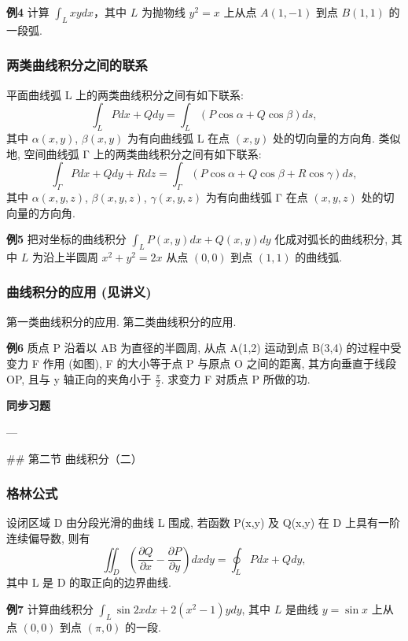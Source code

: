 \textbf{例4} 计算 \(\int_{L} xydx\)，其中 \(L\) 为抛物线 \(y^2 = x\) 上从点 \(A(1, -1)\) 到点 \(B(1, 1)\) 的一段弧.


\subsubsection*{两类曲线积分之间的联系}


平面曲线弧 L 上的两类曲线积分之间有如下联系:
\[ \int_L Pdx + Qdy = \int_L (P \cos \alpha + Q \cos \beta) ds, \]
其中 \(\alpha(x, y)\), \(\beta(x, y)\) 为有向曲线弧 L 在点 \((x, y)\) 处的切向量的方向角.
类似地, 空间曲线弧 Γ 上的两类曲线积分之间有如下联系:
\[ \int_{\Gamma} Pdx + Qdy + Rdz = \int_{\Gamma} (P \cos \alpha + Q \cos \beta + R \cos \gamma) ds, \]
其中 \(\alpha(x, y, z)\), \(\beta(x, y, z)\), \(\gamma(x, y, z)\) 为有向曲线弧 Γ 在点 \((x, y, z)\) 处的切向量的方向角.

\textbf{例5} 把对坐标的曲线积分 \(\int_{L} P(x, y) dx + Q(x, y) dy\) 化成对弧长的曲线积分, 其中 \(L\) 为沿上半圆周 \(x^2 + y^2 = 2x\) 从点 \((0, 0)\) 到点 \((1, 1)\) 的曲线弧.


\subsubsection*{曲线积分的应用 (见讲义)}


第一类曲线积分的应用.
第二类曲线积分的应用.

\textbf{例6}
质点 P 沿着以 AB 为直径的半圆周, 从点 A(1,2) 运动到点 B(3,4) 的过程中受变力 F 作用 (如图), F 的大小等于点 P 与原点 O 之间的距离, 其方向垂直于线段 OP, 且与 y 轴正向的夹角小于 \(\frac{\pi}{2}\). 求变力 F 对质点 P 所做的功.


\medskip
\textbf{同步习题}
\medskip

---

## 第二节 曲线积分（二）


\subsubsection*{格林公式}


设闭区域 D 由分段光滑的曲线 L 围成, 若函数 P(x,y) 及 Q(x,y) 在 D 上具有一阶连续偏导数, 则有
\[ \iint_D \left( \frac{\partial Q}{\partial x} - \frac{\partial P}{\partial y} \right) dxdy = \oint_L Pdx + Qdy, \]
其中 L 是 D 的取正向的边界曲线.

\textbf{例7} 计算曲线积分 \(\int_{L} \sin 2x dx + 2(x^2 - 1) y dy\), 其中 \(L\) 是曲线 \(y = \sin x\) 上从点 \((0, 0)\) 到点 \((\pi, 0)\) 的一段.

